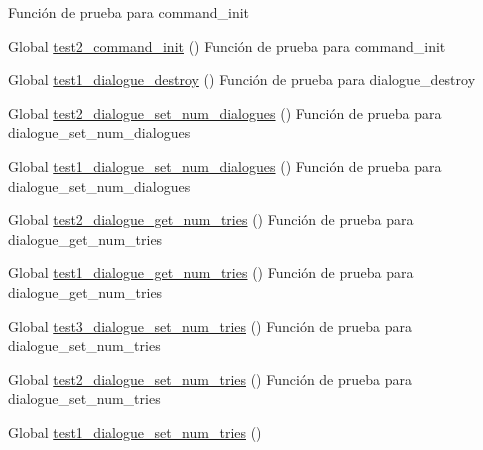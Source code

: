 \begin{DoxyRefList}
%
Función de prueba para command\+\_\+init  
\item[Global \mbox{\hyperlink{command__test_8c_a084363877b09c47c4167fb675ba0a6c5}{test2\+\_\+command\+\_\+init}} ()]\label{test__test000002}%
%
Función de prueba para command\+\_\+init  
\item[Global \mbox{\hyperlink{dialogue__test_8c_afdb9ffac2d5dd49b0d1af9361fc7a3b1}{test1\+\_\+dialogue\+\_\+destroy}} ()]\label{test__test000029}%
%
Función de prueba para dialogue\+\_\+destroy  
\item[Global \mbox{\hyperlink{dialogue__test_8c_a7cc73bd02f475226a272f54875843476}{test2\+\_\+dialogue\+\_\+set\+\_\+num\+\_\+dialogues}} ()]\label{test__test000037}%
%
Función de prueba para dialogue\+\_\+set\+\_\+num\+\_\+dialogues  
\item[Global \mbox{\hyperlink{dialogue__test_8c_a34b7e470fa638f64241a388b9f180845}{test1\+\_\+dialogue\+\_\+set\+\_\+num\+\_\+dialogues}} ()]\label{test__test000036}%
%
Función de prueba para dialogue\+\_\+set\+\_\+num\+\_\+dialogues  
\item[Global \mbox{\hyperlink{dialogue__test_8c_a47aa1f5a276f6d91c591ea2f69769f83}{test2\+\_\+dialogue\+\_\+get\+\_\+num\+\_\+tries}} ()]\label{test__test000035}%
%
Función de prueba para dialogue\+\_\+get\+\_\+num\+\_\+tries  
\item[Global \mbox{\hyperlink{dialogue__test_8c_a99fc5930cbe8b1fa8247892b656c9d0d}{test1\+\_\+dialogue\+\_\+get\+\_\+num\+\_\+tries}} ()]\label{test__test000034}%
%
Función de prueba para dialogue\+\_\+get\+\_\+num\+\_\+tries  
\item[Global \mbox{\hyperlink{dialogue__test_8c_a7d6378914dc63cfbfa6365d2614d2922}{test3\+\_\+dialogue\+\_\+set\+\_\+num\+\_\+tries}} ()]\label{test__test000033}%
%
Función de prueba para dialogue\+\_\+set\+\_\+num\+\_\+tries  
\item[Global \mbox{\hyperlink{dialogue__test_8c_ae195f173f4cbfd95cf271f77774f9984}{test2\+\_\+dialogue\+\_\+set\+\_\+num\+\_\+tries}} ()]\label{test__test000032}%
%
Función de prueba para dialogue\+\_\+set\+\_\+num\+\_\+tries  
\item[Global \mbox{\hyperlink{dialogue__test_8c_ac07f19fa039babf738bc6209c26a865a}{test1\+\_\+dialogue\+\_\+set\+\_\+num\+\_\+tries}} ()]\label{test__test000031}%

\end{DoxyRefList}
